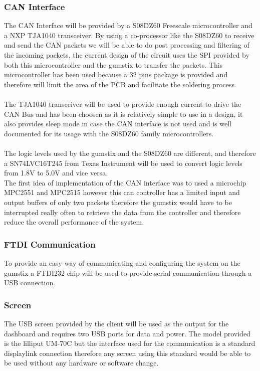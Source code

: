 \documentclass[11pt,a4wide]{article}
\begin{document}
\subsubsection{CAN Interface}
The CAN Interface will be provided by a S08DZ60 Freescale microcontroller and a NXP TJA1040 transceiver. By using a co-processor like the S08DZ60 to receive and send the CAN packets we will be able to do post processing and filtering of the incoming packets, the current design of the circuit uses the SPI provided by both this microcontroller and the gumstix to transfer the packets. This microcontroller has been used because a 32 pins package is provided and therefore will limit the area of the PCB and facilitate the soldering process.\\
\\
The TJA1040 transceiver will be used to provide enough current to drive the CAN Bus and has been choosen as it is relatively simple to use in a design, it also provides sleep mode in case the CAN interface is not used and is well documented for its usage with the S08DZ60 family microcontrollers.\\
\\
The logic levels used by the gumstix and the S08DZ60 are different, and therefore a SN74LVC16T245 from Texas Instrument will be used to convert logic levels from 1.8V to 5.0V and vice versa.
\\
The first idea of implementation of the CAN interface was to used a microchip MPC2551 and MPC2515 however this can controller has a limited input and output buffers of only two packets therefore the gumstix would have to be interrupted really often to retrieve the data from the controller and therefore reduce the overall performance of the system.

\subsubsection{FTDI Communication}
To provide an easy way of communicating and configuring the system on the gumstix a FTDI232 chip will be used to provide serial communication through a USB connection.

\subsubsection{Screen}
The USB screen provided by the client will be used as the output for the dashboard and requires two USB ports for data and power. The model provided is the lilliput UM-70C but the interface used for the communication is a standard displaylink connection therefore any screen using this standard would be able to be used without any hardware or software change.
\end{document}
